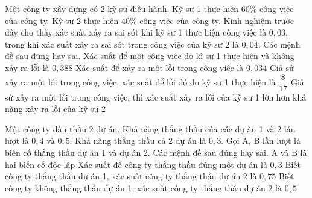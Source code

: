 \begin{ex}%
    Một công ty xây dựng có 2 kỹ sư điều hành. Kỹ sư-1 thực hiện $60\%$ công việc của công ty. Kỹ sư-2 thực hiện $40\%$ công việc của công ty. Kinh nghiệm trước đây cho thấy xác suất xảy ra sai sót khi kỹ sư 1 thực hiện công việc là $0,03$, trong khi xác suất xảy ra sai sót trong công việc của kỹ sư 2 là $0,04$. Các mệnh đề sau đúng hay sai.
    \choiceTF
    { Xác suất để một công việc do kĩ sư 1 thực hiện và không xảy ra lỗi là $0,388$}
    {\True Xác suất để xảy ra một lỗi trong công việc là $0,034$}
    { Giả sử xảy ra một lỗi trong công việc, xác suất để lỗi đó do kỹ sư 1 thực hiện là $\dfrac{8}{17}$}
    {\True Giả sử xảy ra một lỗi trong công việc, thì xác suất xảy ra lỗi của kỹ sư 1 lớn hơn khả năng xảy ra lỗi của kỹ sư 2}
\end{ex}
\begin{ex}%
    Một công ty đấu thầu 2 dự án. Khả năng thắng thầu của các dự án 1 và 2 lần lượt là $0,4$ và $0,5$. Khả năng thắng thầu cả 2 dự án là $0,3$. Gọi A, B lần lượt là biến cố thắng thầu dự án 1 và dự án 2. Các mệnh đề sau đúng hay sai.
    \choiceTF
    { A và B là hai biến cố độc lập}
    {\True Xác suất để công ty thắng thầu đúng một dự án là $0,3$}
    {\True Biết công ty thắng thầu dự án 1, xác suất công ty thắng thầu dự án 2 là $0,75$}
    { Biết công ty không thắng thầu dự án 1, xác suất công ty thắng thầu dự án 2 là $0,5$}
\end{ex}
